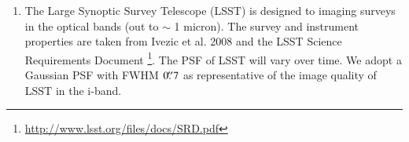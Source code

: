 \documentclass[a4paper,11pt]{article}
\begin{document}
\begin{enumerate}
\item The Large Synoptic Survey Telescope (LSST) is designed to imaging surveys in the optical bands (out to $\sim$ 1 micron). %
The survey and instrument properties are taken from Ivezic et al. 2008 \cite{2008arXiv0805.2366I} and the LSST Science Requirements Document \footnote{\url{http://www.lsst.org/files/docs/SRD.pdf}}. The PSF of LSST will vary over time. We adopt a Gaussian PSF with FWHM $0\hbox{$.\!\!^{\prime\prime}$}7$ as representative of the image quality of LSST in the i-band.

\end{enumerate}

\end{document}
